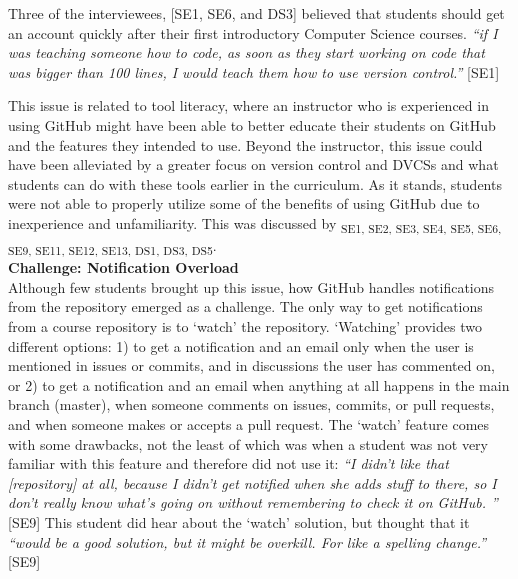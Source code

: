 Three of the interviewees, [SE1, SE6, and DS3] believed that students should get an account quickly after their first introductory Computer Science courses. \textit{``if I was teaching someone how to code, as soon as they start working on code that was bigger than 100 lines, I would teach them how to use version control.''} [SE1]



This issue is related to tool literacy, where an instructor who is experienced in using GitHub might have been able to better educate their students on GitHub and the features they intended to use. Beyond the instructor, this issue could have been alleviated by a greater focus on version control and DVCSs and what students can do with these tools earlier in the curriculum. As it stands, students were not able to properly utilize some of the benefits of using GitHub due to inexperience and unfamiliarity. This was discussed by \textsubscript{SE1, SE2, SE3, SE4, SE5, SE6, SE9, SE11, SE12, SE13, DS1, DS3, DS5}. \\

\textbf{Challenge: Notification Overload} \\
Although few students brought up this issue, how GitHub handles notifications from the repository emerged as a challenge. The only way to get notifications from a course repository is to `watch' the repository. `Watching' provides two different options: 1) to get a notification and an email only when the user is mentioned in issues or commits, and in discussions the user has commented on, or 2) to get a notification and an email when anything at all happens in the main branch (master), when someone comments on issues, commits, or pull requests, and when someone makes or accepts a pull request. The `watch' feature comes with some drawbacks, not the least of which was when a student was not very familiar with this feature and therefore did not use it: \textit{``I didn't like that [repository] at all, because I didn't get notified when she adds stuff to there, so I don't really know what's going on without remembering to check it on GitHub. ''} [SE9] This student did hear about the `watch' solution, but thought that it \textit{``would be a good solution, but it might be overkill. For like a spelling change.''} [SE9]

